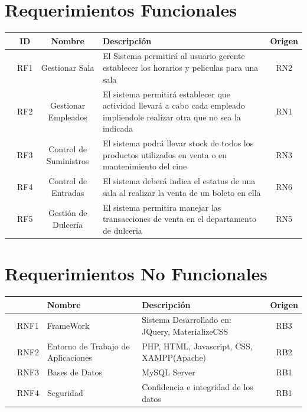 \documentclass[11pt, fleqn]{article}                             %
\begin{document}
\section{Requerimientos Funcionales}
\begin{tabular}{r ||c |c | m{15em} |c }
   &  ID & Nombre & Descripción & Origen \\ [0.5ex] 
   \hline\hline
  
    & RF1 & Gestionar Sala          &
    El Sistema permitirá al usuario gerente establecer los horarios y peliculas para una sala
    & RN2\\
    & RF2 & Gestionar Empleados     & 
    El sistema permitirá establecer que actividad llevará a cabo cada empleado impliendole
    realizar otra que no sea la indicada
    & RN1\\
    & RF3 & Control de Suministros  &
    El sistema podrá llevar stock de todos los productos utilizados en venta o en mantenimiento del cine
    & RN3\\
    & RF4 & Control de Entradas     &
    El sistema deberá indica el estatus de una sala al realizar la venta de un boleto en ella
    & RN6\\
    & RF5 & Gestión de Dulcería     & 
    El sistema permitira manejar las transacciones de venta en el departamento de dulceria
    & RN5\\
\end{tabular}



\section{Requerimientos No Funcionales}
    \begin{tabular}{r ||c |m{8em} | m{18em} |c }
       &   & Nombre & Descripción & Origen \\ [0.5ex] 
       \hline\hline
        & RNF1 & FrameWork &
        Sistema Desarrollado en: JQuery, MaterializeCSS
        & RB3\\

        & RNF2 & Entorno de Trabajo de Aplicaciones &
        PHP, HTML, Javascript, CSS, XAMPP(Apache)  
        & RB2\\

        & RNF3 & Bases de Datos & MySQL Server
        & RB1\\

        & RNF4 & Seguridad & Confidencia e integridad de los datos
        & RB1\\
    \end{tabular}


\clearpage
    



\clearpage

    
\end{document}
